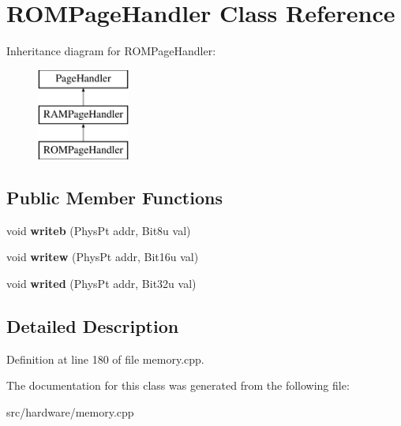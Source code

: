 \hypertarget{classROMPageHandler}{\section{R\-O\-M\-Page\-Handler Class Reference}
\label{classROMPageHandler}
}
Inheritance diagram for R\-O\-M\-Page\-Handler\-:\begin{figure}[H]
\begin{center}
\leavevmode
\includegraphics[height=3.000000cm]{classROMPageHandler}
\end{center}
\end{figure}
\subsection*{Public Member Functions}
\begin{DoxyCompactItemize}
\item 
\hypertarget{classROMPageHandler_a1c0198f154f15547987f5719099c7337}{void {\bfseries writeb} (Phys\-Pt addr, Bit8u val)}\label{classROMPageHandler_a1c0198f154f15547987f5719099c7337}

\item 
\hypertarget{classROMPageHandler_a995ec4ce3bbd008b9202876e7685fc31}{void {\bfseries writew} (Phys\-Pt addr, Bit16u val)}\label{classROMPageHandler_a995ec4ce3bbd008b9202876e7685fc31}

\item 
\hypertarget{classROMPageHandler_ace00a50edbd7ef46d48ee19755500193}{void {\bfseries writed} (Phys\-Pt addr, Bit32u val)}\label{classROMPageHandler_ace00a50edbd7ef46d48ee19755500193}

\end{DoxyCompactItemize}


\subsection{Detailed Description}


Definition at line 180 of file memory.\-cpp.



The documentation for this class was generated from the following file\-:\begin{DoxyCompactItemize}
\item 
src/hardware/memory.\-cpp\end{DoxyCompactItemize}
